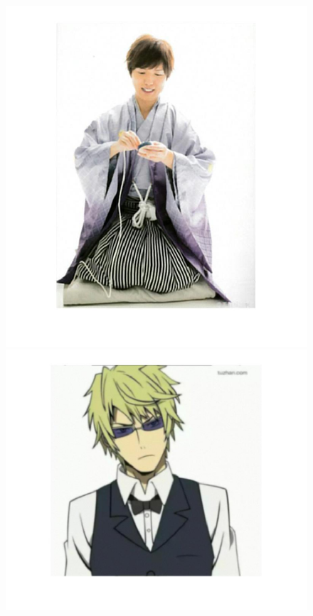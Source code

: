 \documentclass{article}
\theoremstyle{plain} \newtheorem{thm}{Theorem}
\begin{document}
\begin{figure}
\begin{minipage}{.5\linewidth}
		\includegraphics[width=\linewidth]{kamiya_recovered_cyclic.jpg}
	\end{minipage}
	\begin{minipage}{.5\linewidth}
		\includegraphics[width=\textwidth]{shizuwo_blurred_cyclic.jpg}

\end{minipage}
\end{figure}
\end{document}
